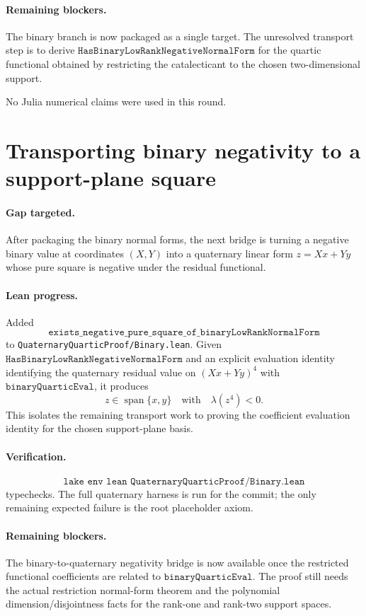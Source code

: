 \documentclass[11pt]{article}
\begin{document}
\paragraph{Remaining blockers.}
The binary branch is now packaged as a single target.  The unresolved transport
step is to derive \(\texttt{HasBinaryLowRankNegativeNormalForm}\) for the
quartic functional obtained by restricting the catalecticant to the chosen
two-dimensional support.

No Julia numerical claims were used in this round.

\section*{Transporting binary negativity to a support-plane square}

\paragraph{Gap targeted.}
After packaging the binary normal forms, the next bridge is turning a negative
binary value at coordinates \((X,Y)\) into a quaternary linear form
\(z=Xx+Yy\) whose pure square is negative under the residual functional.

\paragraph{Lean progress.}
Added
\[
\texttt{exists\_negative\_pure\_square\_of\_binaryLowRankNormalForm}
\]
to \texttt{QuaternaryQuarticProof/Binary.lean}.  Given
\(\texttt{HasBinaryLowRankNegativeNormalForm}\) and an explicit evaluation
identity identifying the quaternary residual value on
\((Xx+Yy)^4\) with \(\texttt{binaryQuarticEval}\), it produces
\[
z\in\operatorname{span}\{x,y\}
\quad\text{with}\quad
\lambda(z^4)<0.
\]
This isolates the remaining transport work to proving the coefficient
evaluation identity for the chosen support-plane basis.

\paragraph{Verification.}
\[
\texttt{lake env lean QuaternaryQuarticProof/Binary.lean}
\]
typechecks.  The full quaternary harness is run for the commit; the only
remaining expected failure is the root placeholder axiom.

\paragraph{Remaining blockers.}
The binary-to-quaternary negativity bridge is now available once the restricted
functional coefficients are related to
\(\texttt{binaryQuarticEval}\).  The proof still needs the actual restriction
normal-form theorem and the polynomial dimension/disjointness facts for the
rank-one and rank-two support spaces.
\end{document}
